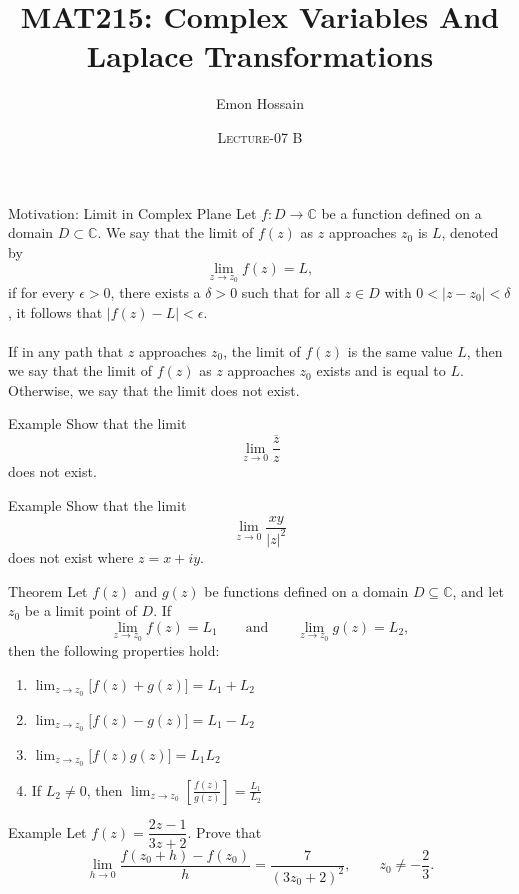 \documentclass[11pt]{beamer}
\author[] %
{Emon Hossain\inst{1}}
\institute[University of Dhaka] %
{
  \inst{1}%
  Lecturer\\MNS department\\Brac University
}
\date[] %
{\textsc{Lecture-07 B}}
\title[]{MAT215: Complex Variables And Laplace Transformations}
\theoremstyle{plain}
\begin{document}
\begin{frame}
\titlepage
\end{frame}


\begin{frame}{Motivation: Limit in Complex Plane}
Let $f : D \to \mathbb{C}$ be a function defined on a domain $D \subset \mathbb{C}$.
We say that the limit of $f(z)$ as $z$ approaches $z_0$ is $L$, denoted by
\[
\lim_{z\to z_0} f(z) = L,
\]
if for every $\epsilon > 0$, there exists a $\delta > 0$ such that for all $z \in D$ with
$0 < |z - z_0| < \delta$, it follows that $|f(z) - L| < \epsilon$.\\~\\
If in any path that $z$ approaches $z_0$, the limit of $f(z)$ is the same value
$L$, then we say that the limit of $f(z)$ as $z$ approaches $z_0$ exists and is
equal to $L$. Otherwise, we say that the limit does not exist.
\end{frame}
\begin{frame}{Example}
Show that the limit
\[
\lim_{z \to 0} \frac{\overline{z}}{z}
\]
does not exist.
\end{frame}
\begin{frame}{Example}
Show that the limit
\[
\lim_{z \to 0} \frac{xy}{|z|^2}
\]
does not exist where $z = x + iy$.
\end{frame}
\begin{frame}{Theorem}
    Let $f(z)$ and $g(z)$ be functions defined on a domain $D \subseteq \mathbb{C}$, and let
$z_0$ be a limit point of $D$. If
\[
\lim_{z\to z_0} f(z) = L_1
\qquad \text{and} \qquad
\lim_{z\to z_0} g(z) = L_2,
\]
then the following properties hold:
\begin{enumerate}
  \item $\displaystyle \lim_{z\to z_0}\bigl[f(z)+g(z)\bigr] = L_1 + L_2$
  \item $\displaystyle \lim_{z\to z_0}\bigl[f(z)-g(z)\bigr] = L_1 - L_2$
  \item $\displaystyle \lim_{z\to z_0}\bigl[f(z)g(z)\bigr] = L_1L_2$
  \item If $L_2 \neq 0$, then $\displaystyle \lim_{z\to z_0}\left[\frac{f(z)}{g(z)}\right] = \frac{L_1}{L_2}$
\end{enumerate}
\end{frame}

\begin{frame}{Example}
    Let $f(z)=\dfrac{2z-1}{3z+2}$. Prove that
\[
\lim_{h\to 0}\frac{f(z_0+h)-f(z_0)}{h}
=
\frac{7}{(3z_0+2)^2},
\qquad z_0\ne -\frac{2}{3}.
\]
\end{frame}
\end{document}
